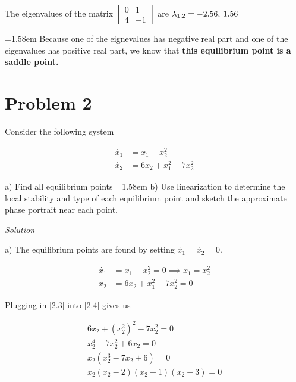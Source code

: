 \documentclass{article}
\begin{document}
  The eigenvalues of the matrix $\begin{bmatrix}
      0 & 1 \\
      4&  -1
  \end{bmatrix}$ are $\lambda_{1,2} = -2.56,\hspace{0.8mm}1.56$ \newline \newline
  
  \hangindent=1.58em
   Because one of the eignevalues has negative real part and one of
  the eigenvalues has positive real part, we know that \textbf{this
    equilibrium point is a saddle point.}
  \newpage  

  \section{Problem 2}

  Consider the following system

  \begin{align*}
    \dot{x_1} &= x_1 - x_2^2 \tag{2.1} \\
    \dot{x_2} &= 6x_2 + x_1^2 - 7x_2^2 \tag{2.2} 
  \end{align*}

  a) Find all equilibrium points \newline
  \hangindent=1.58em
   b) Use linearization to determine the local stability and type of each equilibrium point and sketch the approximate phase portrait near each point. \newline
  
  \noindent \textit{Solution} \newline
  
  a) The equilibrium points are found by setting $\dot{x_1}=\dot{x_2}=0$.

  \begin{align*}
    \dot{x_1} &= x_1 - x_2^2 = 0 \implies x_1 = x_2^2 \tag{2.3} \\
    \dot{x_2} &= 6x_2 + x_1^2 - 7x_2^2 = 0 \tag{2.4} 
  \end{align*}

  Plugging in [2.3] into [2.4] gives us

  \begin{align*}
    6x_2 + (x_2^2)^2 - 7x_2^2 = 0 \\
    x_2^4 - 7x_2^2 + 6x_2 = 0 \\
    x_2(x_2^3 - 7x_2 + 6) = 0 \\
    x_2(x_2-2)(x_2-1)(x_2+3) = 0 \\
  \end{align*}
\end{document}
